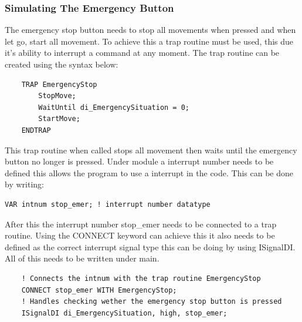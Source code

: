 \documentclass[a4paper,12pt]{article}
\begin{document}
\subsubsection{Simulating The Emergency Button}
The emergency stop button needs to stop all movements when pressed and when let go, start all movement. To achieve this a trap routine must be used, this due it's ability to interrupt a command at any moment. The trap routine can be created using the syntax below:
\begin{lstlisting}
    TRAP EmergencyStop
        StopMove;
        WaitUntil di_EmergencySituation = 0;
        StartMove;
    ENDTRAP
\end{lstlisting}
This trap routine when called stops all movement then waits until the emergency button no longer is pressed. Under module a interrupt number needs to be defined this allows the program to use a interrupt in the code. This can be done by writing: 
\begin{lstlisting}
VAR intnum stop_emer; ! interrupt number datatype
\end{lstlisting}
After this the interrupt number stop\_emer needs to be connected to a trap routine. Using the CONNECT keyword can achieve this it also needs to be defined as the correct interrupt signal type this can be doing by using ISignalDI. All of this needs to be written under main.
\begin{lstlisting}
    ! Connects the intnum with the trap routine EmergencyStop
    CONNECT stop_emer WITH EmergencyStop;
    ! Handles checking wether the emergency stop button is pressed
    ISignalDI di_EmergencySituation, high, stop_emer;
\end{lstlisting}
\end{document}
